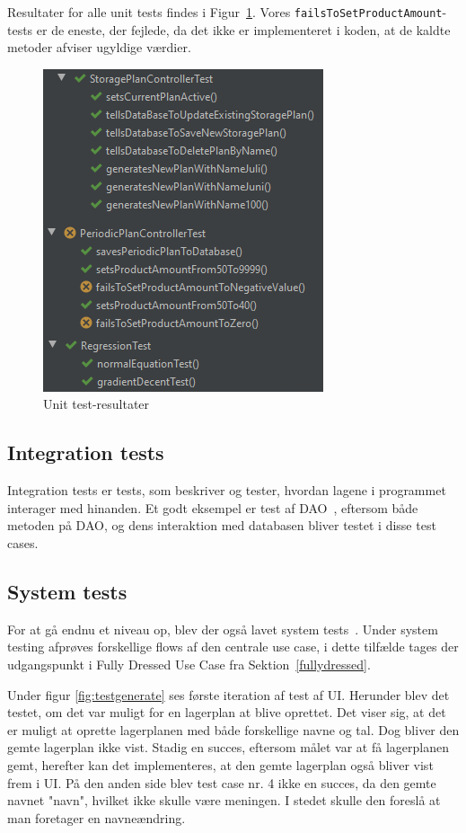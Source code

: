 Resultater for alle unit tests findes i Figur~\ref{fig:unittestresults}. Vores \texttt{failsToSetProductAmount}-tests er de eneste, der fejlede, da det ikke er implementeret i koden, at de kaldte metoder afviser ugyldige værdier.

\begin{figure}
    \centering
    \includegraphics[scale=1]{figures/tests/unittestresults}
    \caption{Unit test-resultater \label{fig:unittestresults}}
\end{figure}

\subsection{Integration tests}
Integration tests er tests, som beskriver og tester, hvordan lagene i programmet interager med hinanden. Et godt eksempel er test af DAO~\cite{DAO}, eftersom både metoden på DAO, og dens interaktion med databasen bliver testet i disse test cases.

\subsection{System tests}
For at gå endnu et niveau op, blev der også lavet system tests~\cite{TestLevels}. Under system testing afprøves forskellige flows af den centrale use case, i dette tilfælde tages der udgangspunkt i Fully Dressed Use Case fra Sektion~\ref{fullydressed}.

Under figur \ref{fig:testgenerate} ses første iteration af test af UI. Herunder blev det testet, om det var muligt for en lagerplan at blive oprettet. Det viser sig, at det er muligt at oprette lagerplanen med både forskellige navne og tal. Dog bliver den gemte lagerplan ikke vist. Stadig en succes, eftersom målet var at få lagerplanen gemt, herefter kan det implementeres, at den gemte lagerplan også bliver vist frem i UI. På den anden side blev test case nr. 4 ikke en succes, da den gemte navnet "navn", hvilket ikke skulle være meningen. I stedet skulle den foreslå at man foretager en navneændring.

